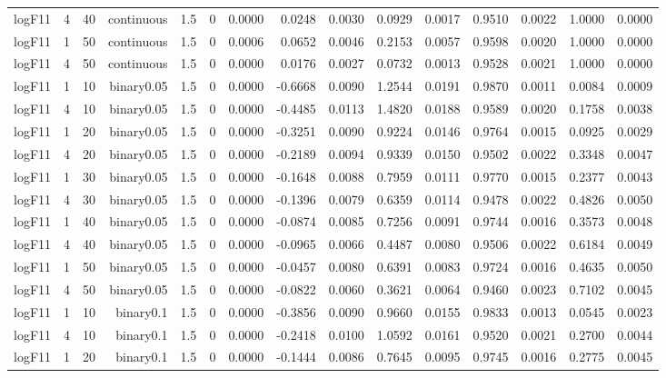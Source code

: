 \begin{longtable}{rrrrrrrrrrrrrrr}
  logF11 & 4 & 40 & continuous & 1.5 & 0 & 0.0000 & 0.0248 & 0.0030 & 0.0929 & 0.0017 & 0.9510 & 0.0022 & 1.0000 & 0.0000 \\ 
  logF11 & 1 & 50 & continuous & 1.5 & 0 & 0.0006 & 0.0652 & 0.0046 & 0.2153 & 0.0057 & 0.9598 & 0.0020 & 1.0000 & 0.0000 \\ 
  logF11 & 4 & 50 & continuous & 1.5 & 0 & 0.0000 & 0.0176 & 0.0027 & 0.0732 & 0.0013 & 0.9528 & 0.0021 & 1.0000 & 0.0000 \\ 
  logF11 & 1 & 10 & binary0.05 & 1.5 & 0 & 0.0000 & -0.6668 & 0.0090 & 1.2544 & 0.0191 & 0.9870 & 0.0011 & 0.0084 & 0.0009 \\ 
  logF11 & 4 & 10 & binary0.05 & 1.5 & 0 & 0.0000 & -0.4485 & 0.0113 & 1.4820 & 0.0188 & 0.9589 & 0.0020 & 0.1758 & 0.0038 \\ 
  logF11 & 1 & 20 & binary0.05 & 1.5 & 0 & 0.0000 & -0.3251 & 0.0090 & 0.9224 & 0.0146 & 0.9764 & 0.0015 & 0.0925 & 0.0029 \\ 
  logF11 & 4 & 20 & binary0.05 & 1.5 & 0 & 0.0000 & -0.2189 & 0.0094 & 0.9339 & 0.0150 & 0.9502 & 0.0022 & 0.3348 & 0.0047 \\ 
  logF11 & 1 & 30 & binary0.05 & 1.5 & 0 & 0.0000 & -0.1648 & 0.0088 & 0.7959 & 0.0111 & 0.9770 & 0.0015 & 0.2377 & 0.0043 \\ 
  logF11 & 4 & 30 & binary0.05 & 1.5 & 0 & 0.0000 & -0.1396 & 0.0079 & 0.6359 & 0.0114 & 0.9478 & 0.0022 & 0.4826 & 0.0050 \\ 
  logF11 & 1 & 40 & binary0.05 & 1.5 & 0 & 0.0000 & -0.0874 & 0.0085 & 0.7256 & 0.0091 & 0.9744 & 0.0016 & 0.3573 & 0.0048 \\ 
  logF11 & 4 & 40 & binary0.05 & 1.5 & 0 & 0.0000 & -0.0965 & 0.0066 & 0.4487 & 0.0080 & 0.9506 & 0.0022 & 0.6184 & 0.0049 \\ 
  logF11 & 1 & 50 & binary0.05 & 1.5 & 0 & 0.0000 & -0.0457 & 0.0080 & 0.6391 & 0.0083 & 0.9724 & 0.0016 & 0.4635 & 0.0050 \\ 
  logF11 & 4 & 50 & binary0.05 & 1.5 & 0 & 0.0000 & -0.0822 & 0.0060 & 0.3621 & 0.0064 & 0.9460 & 0.0023 & 0.7102 & 0.0045 \\ 
  logF11 & 1 & 10 & binary0.1 & 1.5 & 0 & 0.0000 & -0.3856 & 0.0090 & 0.9660 & 0.0155 & 0.9833 & 0.0013 & 0.0545 & 0.0023 \\ 
  logF11 & 4 & 10 & binary0.1 & 1.5 & 0 & 0.0000 & -0.2418 & 0.0100 & 1.0592 & 0.0161 & 0.9520 & 0.0021 & 0.2700 & 0.0044 \\ 
  logF11 & 1 & 20 & binary0.1 & 1.5 & 0 & 0.0000 & -0.1444 & 0.0086 & 0.7645 & 0.0095 & 0.9745 & 0.0016 & 0.2775 & 0.0045 \\ 

\end{longtable}
